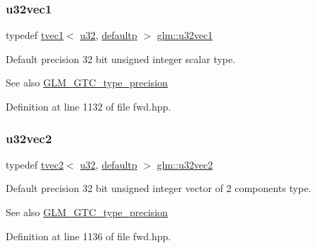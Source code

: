 \subsubsection{\texorpdfstring{u32vec1}{u32vec1}}
{\footnotesize\ttfamily typedef \mbox{\hyperlink{structglm_1_1tvec1}{tvec1}}$<$ \mbox{\hyperlink{group__gtc__type__precision_ga54e837745059fd29017bed71cfa0a8db}{u32}}, \mbox{\hyperlink{namespaceglm_a0f04f086094c747d227af4425893f545a9d21ccd8b5a009ec7eb7677befc3bf51}{defaultp}} $>$ \mbox{\hyperlink{group__gtc__type__precision_ga09dd72852808c32ba398674736b9672a}{glm\+::u32vec1}}}

Default precision 32 bit unsigned integer scalar type. \begin{DoxySeeAlso}{See also}
\mbox{\hyperlink{group__gtc__type__precision}{G\+L\+M\+\_\+\+G\+T\+C\+\_\+type\+\_\+precision}} 
\end{DoxySeeAlso}


Definition at line 1132 of file fwd.\+hpp.

\mbox{\label{group__gtc__type__precision_gad3a81c0d5a6941bb9ffdc9fa8611b426}} 
\subsubsection{\texorpdfstring{u32vec2}{u32vec2}}
{\footnotesize\ttfamily typedef \mbox{\hyperlink{structglm_1_1tvec2}{tvec2}}$<$ \mbox{\hyperlink{group__gtc__type__precision_ga54e837745059fd29017bed71cfa0a8db}{u32}}, \mbox{\hyperlink{namespaceglm_a0f04f086094c747d227af4425893f545a9d21ccd8b5a009ec7eb7677befc3bf51}{defaultp}} $>$ \mbox{\hyperlink{group__gtc__type__precision_gad3a81c0d5a6941bb9ffdc9fa8611b426}{glm\+::u32vec2}}}

Default precision 32 bit unsigned integer vector of 2 components type. \begin{DoxySeeAlso}{See also}
\mbox{\hyperlink{group__gtc__type__precision}{G\+L\+M\+\_\+\+G\+T\+C\+\_\+type\+\_\+precision}} 
\end{DoxySeeAlso}


Definition at line 1136 of file fwd.\+hpp.

\mbox{\label{group__gtc__type__precision_ga16b26751ba6b83c8a0226b9834d73fdc}} 
